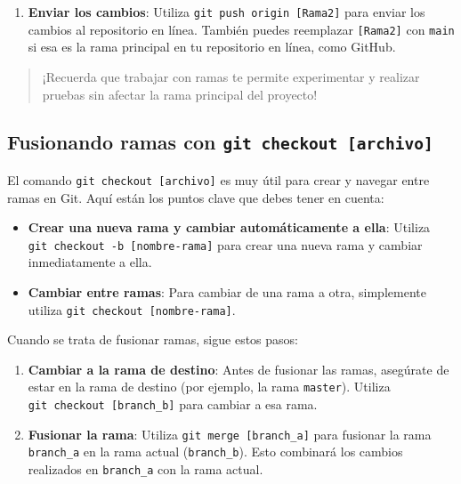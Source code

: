 \documentclass[
  a4paper,
]{article}
\providecommand{\tightlist}{%
  \setlength{\itemsep}{0pt}\setlength{\parskip}{0pt}}\usepackage{longtable,booktabs,array}
\begin{document}
\begin{enumerate}
\def\labelenumi{\arabic{enumi}.}
\tightlist
\item
  \textbf{Enviar los cambios}: Utiliza
  \texttt{git\ push\ origin\ {[}Rama2{]}} para enviar los cambios al
  repositorio en línea. También puedes reemplazar \texttt{{[}Rama2{]}}
  con \texttt{main} si esa es la rama principal en tu repositorio en
  línea, como GitHub.
\end{enumerate}

\begin{quote}
¡Recuerda que trabajar con ramas te permite experimentar y realizar
pruebas sin afectar la rama principal del proyecto!
\end{quote}

\subsection{\texorpdfstring{Fusionando ramas con
\texttt{git\ checkout\ {[}archivo{]}}}{Fusionando ramas con git checkout {[}archivo{]}}}\label{fusionando-ramas-con-git-checkout-archivo}

El comando \texttt{git\ checkout\ {[}archivo{]}} es muy útil para crear
y navegar entre ramas en Git. Aquí están los puntos clave que debes
tener en cuenta:

\begin{itemize}
\item
  \textbf{Crear una nueva rama y cambiar automáticamente a ella}:
  Utiliza \texttt{git\ checkout\ -b\ {[}nombre-rama{]}} para crear una
  nueva rama y cambiar inmediatamente a ella.
\item
  \textbf{Cambiar entre ramas}: Para cambiar de una rama a otra,
  simplemente utiliza \texttt{git\ checkout\ {[}nombre-rama{]}}.
\end{itemize}

Cuando se trata de fusionar ramas, sigue estos pasos:

\begin{enumerate}
\def\labelenumi{\arabic{enumi}.}
\item
  \textbf{Cambiar a la rama de destino}: Antes de fusionar las ramas,
  asegúrate de estar en la rama de destino (por ejemplo, la rama
  \texttt{master}). Utiliza \texttt{git\ checkout\ {[}branch\_b{]}} para
  cambiar a esa rama.
\item
  \textbf{Fusionar la rama}: Utiliza
  \texttt{git\ merge\ {[}branch\_a{]}} para fusionar la rama
  \texttt{branch\_a} en la rama actual (\texttt{branch\_b}). Esto
  combinará los cambios realizados en \texttt{branch\_a} con la rama
  actual.
\end{enumerate}
\end{document}
